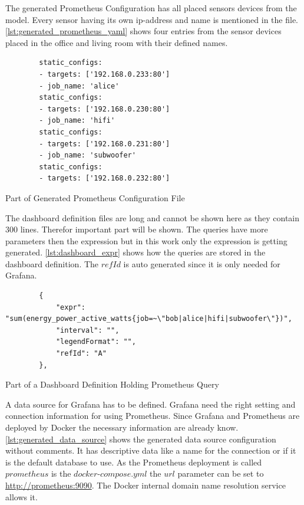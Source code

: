 The generated Prometheus Configuration has all placed sensors devices from the model. Every sensor having its own \gls{ip-address} and name is mentioned in the file. \cref{lst:generated_prometheus_yaml} shows four entries from the sensor devices placed in the office and living room with their defined names.

\begin{listing}[!ht]
	\begin{verbatim}
		static_configs:
		- targets: ['192.168.0.233:80']
		- job_name: 'alice'
		static_configs:
		- targets: ['192.168.0.230:80']
		- job_name: 'hifi'
		static_configs:
		- targets: ['192.168.0.231:80']
		- job_name: 'subwoofer'
		static_configs:
		- targets: ['192.168.0.232:80']
	\end{verbatim}
	\caption{Part of Generated Prometheus Configuration File}
	\label{lst:generated_prometheus_yaml}
\end{listing}

The dashboard definition files are long and cannot be shown here as they contain 300 lines. Therefor important part will be shown. The queries have more parameters then the expression but in this work only the expression is getting generated. \cref{lst:dashboard_expr} shows how the queries are stored in the dashboard definition. The $refId$ is auto generated since it is only needed for Grafana.

\begin{listing}[!ht]
	\begin{verbatim}
		{
			"expr": "sum(energy_power_active_watts{job=~\"bob|alice|hifi|subwoofer\"})",
			"interval": "",
			"legendFormat": "",
			"refId": "A" 
		},
	\end{verbatim}
	\caption{Part of a Dashboard Definition Holding Prometheus Query}
	\label{lst:dashboard_expr}
\end{listing}

A data source for Grafana has to be defined. Grafana need the right setting and connection information for using Prometheus. Since Grafana and Prometheus are deployed by Docker the necessary information are already know. \cref{lst:generated_data_source} shows the generated data source configuration without comments. It has descriptive data like a name for the connection or if it is the default database to use. As the Prometheus deployment is called $prometheus$ is the $docker\text{-}compose.yml$ the $url$ parameter can be set to \url{http://prometheus:9090}. The Docker internal domain name resolution service allows it.

